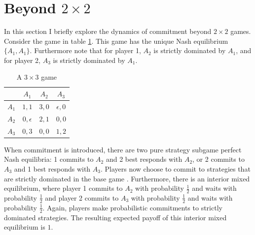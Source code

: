 \documentclass[../paper.tex]{subfiles}
\begin{document}
\section{Beyond $2\times2$}\label{sec:beyond2x2}
In this section I briefly explore the dynamics of commitment beyond $2\times 2$ games. Consider the game in table \ref{tab:3x3}. This game has the unique Nash equilibrium $\{A_1,A_1\}$. Furthermore note that for player 1, $A_2$ is strictly dominated by $A_1$, and for player 2, $A_3$ is strictly dominated by $A_1$.
\begin{table}[h!]
\centering
\begin{tabular}{c|ccc}
    & $A_1$ & $A_2$ & $A_3$ \\
    \hline
    $A_1$ & $1,1$ & $3,0$ & $\epsilon,0$ \\
    $A_2$ & $0,\epsilon$ & $2,1$ & $0,0$ \\
    $A_3$ & $0,3$ & $0,0$ & $1,2$ \\
\end{tabular}
\caption{A $3\times3$ game }
\label{tab:3x3}
\end{table}
When commitment is introduced, there are two pure strategy subgame perfect Nash equilibria: 1 commits to $A_2$ and 2 best responds with $A_2$, or 2 commits to $A_3$ and 1 best responds with $A_3$. Players now choose to commit to strategies that are strictly dominated in the base game \parencite[][also make the observation that commitment to dominated strategies is possible]{harrenstein_commitment_2007}. 
Furthermore, there is an interior mixed equilibrium, where player 1 commits to $A_2$ with probability $\frac{1}{2}$ and waits with probability $\frac{1}{2}$ and player 2 commits to $A_3$ with probability $\frac{1}{2}$ and waits with probability $\frac{1}{2}$. Again, players make probabilistic commitments to strictly dominated strategies. The resulting expected payoff of this interior mixed equilibrium is $1$. 
 
\end{document}
